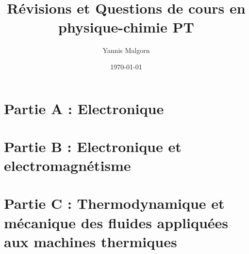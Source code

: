 \documentclass{article}
\title{Révisions et Questions de cours en physique-chimie PT}
\author{Yannis Malgorn}
\date{\today}
\begin{document}
\maketitle
\newpage

\section*{\centering\huge Partie A : Electronique}




\section*{\centering\huge Partie B : Electronique et electromagnétisme} 




\section*{\centering\huge Partie C : Thermodynamique et mécanique des fluides appliquées aux machines thermiques}




\end{document}

